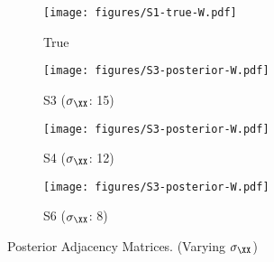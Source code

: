 \begin{figure}[t]
	\centering
	\begin{subfigure}{0.24\textwidth}
		\centering
		\texttt{[image: figures/S1-true-W.pdf]}
		\caption{True}
	\end{subfigure}
	\begin{subfigure}{0.24\textwidth}
		\centering
		\texttt{[image: figures/S3-posterior-W.pdf]}
		\caption{S3 ($\sigma_{\XX}$: 15)}
	\end{subfigure}
	\begin{subfigure}{0.24\textwidth}
		\centering
		\texttt{[image: figures/S3-posterior-W.pdf]}
		\caption{S4 ($\sigma_{\XX}$: 12)}
	\end{subfigure}
	\begin{subfigure}{0.24\textwidth}
		\centering
		\texttt{[image: figures/S3-posterior-W.pdf]}
		\caption{S6 ($\sigma_{\XX}$: 8)}
	\end{subfigure}
	\caption{Posterior Adjacency Matrices. (Varying $\sigma_{\XX}$)}
	\label{fig:S-posterior-2}
\end{figure}
